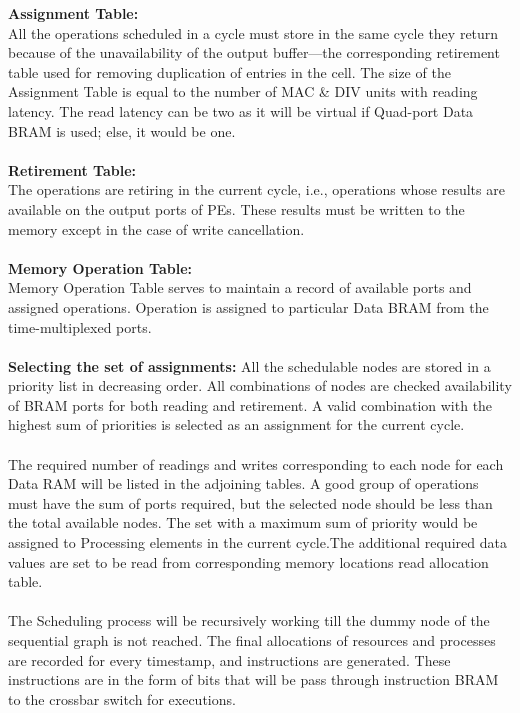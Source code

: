 \textbf{Assignment Table:}\\
All the operations scheduled in a cycle must store in the same cycle they return because of the unavailability of the output buffer—the corresponding retirement table used for removing duplication of entries in the cell. The size of the Assignment Table is equal to the number of MAC \& DIV units with reading latency. The read latency can be two as it will be virtual if Quad-port Data BRAM is used; else, it would be one.
\\
\\
\textbf{Retirement Table:}\\
The operations are retiring in the current cycle, i.e., operations whose results are available on the output ports of PEs. These results must
be written to the memory except in the case of write cancellation.
\\
\\
\textbf{Memory Operation Table:}\\
Memory Operation Table serves to maintain a record of available ports and assigned operations. Operation is assigned to particular Data BRAM from the time-multiplexed ports.
\\
\\
\textbf{Selecting the set of assignments:}
All the schedulable nodes are stored in a priority list in decreasing order. All combinations of nodes are checked availability of BRAM ports for both reading and retirement. A valid combination with the highest sum of priorities is selected as an assignment for the current cycle.
\\
\\
The required number of readings and writes corresponding to each node for each Data RAM will be listed in the adjoining tables. A good group of operations must have the sum of ports required, but the selected node should be less than the total available nodes. The set with a maximum sum of priority would be assigned to Processing elements in the current cycle.The additional required data values are set to be read from corresponding memory locations read allocation table.
\\
\\
The Scheduling process will be recursively working till the dummy node of the sequential graph is not reached. The final allocations of resources and processes are recorded for every timestamp, and instructions are generated. These instructions are in the form of bits that will be pass through instruction BRAM to the crossbar switch for executions.

